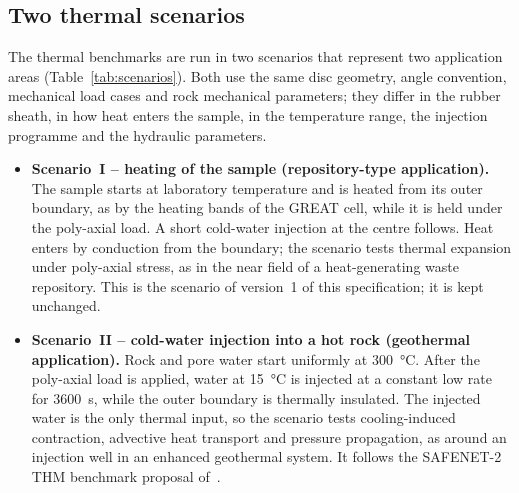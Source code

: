\documentclass[11pt,a4paper]{article}
\begin{document}
\subsection{Two thermal scenarios}
\label{sec:scenarios}
The thermal benchmarks are run in two scenarios that represent two application
areas (Table~\ref{tab:scenarios}). Both use the same disc geometry, angle convention, mechanical load
cases and rock mechanical parameters; they differ in the rubber sheath, in how
heat enters the sample, in the temperature range, the injection programme and
the hydraulic parameters.

\begin{itemize}
  \item \textbf{Scenario~I -- heating of the sample (repository-type
        application).} The sample starts at laboratory temperature and is heated
        from its outer boundary, as by the heating bands of the GREAT cell, while
        it is held under the poly-axial load. A short cold-water injection at the
        centre follows. Heat enters by conduction from the boundary; the
        scenario tests thermal expansion under poly-axial stress, as in the near
        field of a heat-generating waste repository. This is the scenario of
        version~1 of this specification; it is kept unchanged.
  \item \textbf{Scenario~II -- cold-water injection into a hot rock (geothermal
        application).} Rock and pore water start uniformly at
        \SI{300}{\celsius}. After the poly-axial load is applied, water at
        \SI{15}{\celsius} is injected at a constant low rate for \SI{3600}{s},
        while the outer boundary is thermally insulated. The injected water is
        the only thermal input, so the scenario tests cooling-induced
        contraction, advective heat transport and pressure propagation, as
        around an injection well in an enhanced geothermal system. It follows
        the SAFENET-2 THM benchmark proposal of~\cite{Pan2026}.
\end{itemize}
\end{document}
